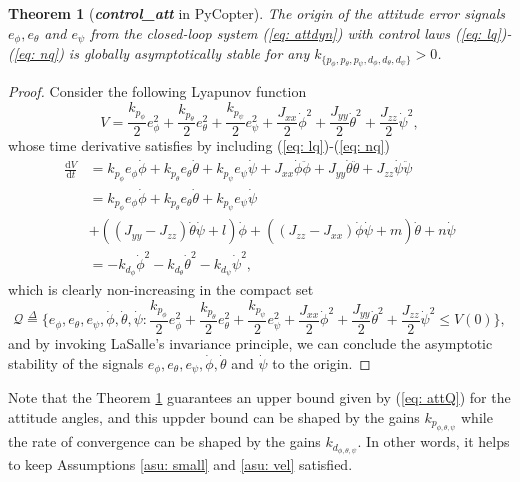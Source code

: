\documentclass[a4paper, onecolumn]{ieeeconf}
\newcommand{\dfb}{\stackrel{\Delta}{=}}
\newtheorem{theorem}{\textbf{Theorem}}[section]
\begin{document}
\begin{theorem}[\emph{\bf control\_att} in PyCopter]
	\label{thm: att}
The origin of the attitude error signals $e_\phi, e_\theta$ and $e_\psi$ from the closed-loop system (\ref{eq: attdyn}) with control laws (\ref{eq: lq})-(\ref{eq: nq}) is globally asymptotically stable for any $k_{\{p_\phi,p_\theta,p_\psi,d_\phi,d_\theta,d_\psi\}}>0$.
\end{theorem}
\begin{proof}
Consider the following Lyapunov function
\begin{equation}
	V = \frac{k_{p_\phi}}{2}e_\phi^2 + \frac{k_{p_\theta}}{2}e_\theta^2 + \frac{k_{p_\psi}}{2}e_\psi^2 + \frac{J_{xx}}{2}\dot\phi^2 + \frac{J_{yy}}{2}\dot\theta^2 + \frac{J_{zz}}{2}\dot\psi^2,
\end{equation}
whose time derivative satisfies by including (\ref{eq: lq})-(\ref{eq: nq})
\begin{align}
	\frac{\mathrm{d}V}{\mathrm{d}t} &= k_{p_\phi}e_\phi\dot\phi + k_{p_\theta}e_\theta \dot\theta +  k_{p_\psi}e_\psi\dot\psi + J_{xx}\dot\phi\ddot\phi + J_{yy}\dot\theta\ddot\theta + J_{zz}\dot\psi\ddot\psi \nonumber \\
&=  k_{p_\phi}e_\phi\dot\phi + k_{p_\theta}e_\theta \dot\theta +  k_{p_\psi}e_\psi\dot\psi \nonumber \\
   &+ \left((J_{yy}-J_{zz})\dot\theta\dot\psi + l\right)\dot\phi + \left((J_{zz}-J_{xx})\dot\phi\dot\psi + m\right)\dot\theta + n\dot\psi \nonumber \\
	  &= -k_{d_\phi}\dot\phi^2 -k_{d_\theta}\dot\theta^2 -k_{d_\psi}\dot\psi^2,
\end{align}
which is clearly non-increasing in the compact set 
\begin{equation}
	\mathcal{Q} \dfb \Big\{e_\phi, e_\theta, e_\psi, \dot\phi, \dot\theta, \dot\psi : \frac{k_{p_\phi}}{2}e_\phi^2 + \frac{k_{p_\theta}}{2}e_\theta^2 + \frac{k_{p_\psi}}{2}e_\psi^2 + \frac{J_{xx}}{2}\dot\phi^2 + \frac{J_{yy}}{2}\dot\theta^2 + \frac{J_{zz}}{2}\dot\psi^2 \leq V(0) \Big\}, \label{eq: attQ}
\end{equation}
and by invoking LaSalle's invariance principle, we can conclude the asymptotic stability of the signals $e_\phi, e_\theta, e_\psi, \dot\phi, \dot\theta$ and $\dot\psi$ to the origin.
\end{proof}
Note that the Theorem \ref{thm: att} guarantees an upper bound given by (\ref{eq: attQ}) for the attitude angles, and this uppder bound can be shaped by the gains $k_{p_{\phi,\theta,\psi}}$ while the rate of convergence can be shaped by the gains $k_{d_{\phi,\theta,\psi}}$. In other words, it helps to keep Assumptions \ref{asu: small} and \ref{asu: vel} satisfied.
\end{document}
